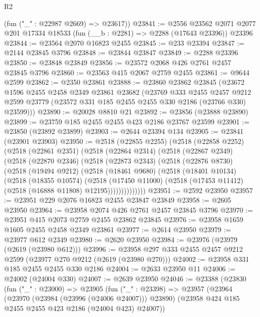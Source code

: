 \begin{lexlean}{R2}
\begin{coremodule}
      (fun ("_" : @22987 @2669) => @23617))
@23841 := @2556
    @23562
    @2071
    @2077
    @201
    @17334
    @18533
    (fun (__b : @2281) => @2288 (@17643 @23396))
    @23396
@23844 := @23564 @2070 @16823 @2455
@23845 := @233 @23394
@23847 := @2144 @23845 @3796
@23848 := @23844 @23847
@23849 := @2288 @23396
@23850 := @23848 @23849
@23856 := @23572 @2068 @426 @2761 @2457 @23845 @3796
@23860 := @23563 @415 @2067 @2759 @2455
@23861 := @9644 @2599
@23862 := @2350 @23861
@23888 := @23860
    @23862
    @23845
    (@23672
      @1596
      @2455
      @2458
      @2349
      @23861
      @23682
      (@23769
        @333
        @2455
        @2457
        @9212
        @2599
        @23779
        (@23572 @331 @185 @2455 @2455 @330 @2186 (@23766 @330) @23599)))
@23890 := @20028 @8810 @21
@23892 := @23856 (@23888 @23890)
@23899 := @23759 @185 @2455 @2455 @423 @2186 @23767 @23599
@23901 := @23850 (@23892 @23899)
@23903 := @2644 @23394 @134
@23905 := @23841 (@23901 @23903)
@23950 := @2518
    (@22855 @2255)
    (@2518
      (@22858 @2252)
      (@2518
        (@22861 @2351)
        (@2518
          (@22864 @2314)
          (@2518
            (@22867 @2349)
            (@2518
              (@22870 @2346)
              (@2518
                (@22873 @2343)
                (@2518
                  (@22876 @8730)
                  (@2518
                    (@19494 @9212)
                    (@2518
                      (@18461 @9680)
                      (@2518
                        (@18401 @10134)
                        (@2518
                          (@18355 @10574)
                          (@2518
                            (@17450 @11000)
                            (@2518 (@17453 @11412) (@2518 (@16888 @11808) @12195))))))))))))))
@23951 := @2592 @23950
@23957 := @23951 @229 @2076 @16823 @2455 @23847 @23849
@23958 := @2605 @23950
@23964 := @23958 @2074 @426 @2761 @2457 @23845 @3796
@23970 := @23951 @415 @2073 @2759 @2455 @23862 @23845
@23976 := @23958 @1659 @1605 @2455 @2458 @2349 @23861
@23977 := @2614 @23950
@23979 := @23977 @612 @2349
@23980 := @2620 @23950
@23984 := @23976 (@23979 (@2619 (@23980 @612)))
@23996 := @23958 @297 @333 @2455 @2457 @9212 @2599 (@23977 @270 @9212 (@2619 (@23980 @270)))
@24002 := @23958 @331 @185 @2455 @2455 @330 @2186
@24004 := @2633 @23950 @11
@24006 := @24002 (@24004 @330)
@24007 := @2639 @23950
@24046 := @23388
    (@23830
      (fun ("_" : @23000) =>
      @23905
        (fun ("_" : @23398) =>
        @23957
          (@23964
            (@23970 (@23984 (@23996 (@24006 @24007))) @23890)
            (@23958 @424 @185 @2455 @2455 @423 @2186 (@24004 @423) @24007))

\end{coremodule}
\end{lexlean}
